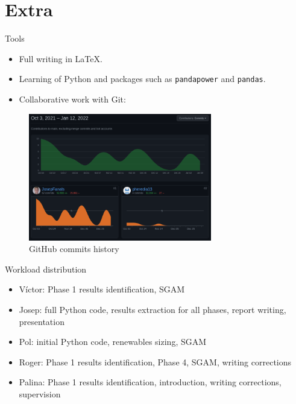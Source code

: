   \section{Extra}
  \begin{frame}{Tools}
    \begin{itemize}
      \item Full writing in \LaTeX.
      \item Learning of Python and packages such as \texttt{pandapower} and \texttt{pandas}.
      \item Collaborative work with Git:
    \end{itemize}
    \begin{figure}
      \includegraphics[width=8cm]{Data/git.png}
      \caption{GitHub commits history}
    \end{figure}

  \end{frame}


  \begin{frame}{Workload distribution}
    \begin{itemize}
      \item Víctor: Phase 1 results identification, SGAM
      \item Josep: full Python code, results extraction for all phases, report writing, presentation
      \item Pol: initial Python code, renewables sizing, SGAM
      \item Roger: Phase 1 results identification, Phase 4, SGAM, writing corrections
      \item Palina: Phase 1 results identification, introduction, writing corrections, supervision
    \end{itemize}

  \end{frame}
